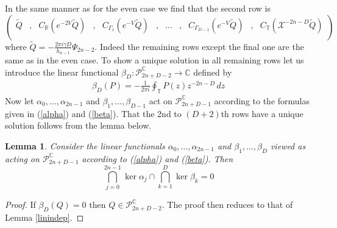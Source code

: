 \documentclass[12pt]{article}
\newtheorem{lemma}[theorem]{Lemma}
\theoremstyle{definition}
\begin{document}
In the same manner as for the even case we find that the second row is
$$\left(\begin{array}{ccccccccccccc} \tilde{Q} &,&  C_{\mathbb{R}}(e^{-2V}  \tilde{Q}) &, & C_{\Gamma_1}(e^{-V} \tilde{Q}) & ,& \dots & ,& C_{\Gamma_{D-1}}(e^{-V}  \tilde{Q}) & ,& C_{\mathbb{T}}( \mathscr{X}^{-2n-D} \tilde{Q}) \\
\end{array}\right)
 $$
 where $\tilde{Q} = -\frac{2\pi i \gamma D}{h_{n-1}} \Psi_{2n-2}$. Indeed the remaining rows except the final one are the same as in the even case. To show a unique solution in all remaining rows let us introduce the linear functional $\beta_D : \mathscr{P}^\mathbb{C}_{2n+D-2} \to \mathbb{C}$ defined by
\begin{align}
\beta_D(P) =- \frac{1}{2\pi i} \oint_\mathbb{T} P(z) z^{-2n-D} \, dz
\end{align}
Now let $\alpha_0, \dots, \alpha_{2n-1}$ and $\beta_1, \dots, \beta_{D-1}$ act on $\mathscr{P}^\mathbb{C}_{2n+D-1}$ according to the formulas given in (\ref{alpha}) and (\ref{beta}). That the 2nd to $(D+2)$th rows have a unique solution follows from the lemma below.
\begin{lemma} Consider the linear functionals $\alpha_0, \dots, \alpha_{2n-1}$ and $\beta_1, \dots, \beta_{D}$ viewed as acting on $\mathscr{P}^\mathbb{C}_{2n+D-1}$ according to (\ref{alpha}) and (\ref{beta}). Then
$$\bigcap_{j=0}^{2n-1} \ker \alpha_j \cap  \bigcap_{k=1}^{D} \ker \beta_k = 0$$
\end{lemma}
\begin{proof}
If $\beta_D (Q) = 0$ then $Q \in \mathscr{P}^\mathbb{C}_{2n+D-2}$.  The proof then reduces to that of Lemma \ref{linindep}.
\end{proof}
\end{document}

